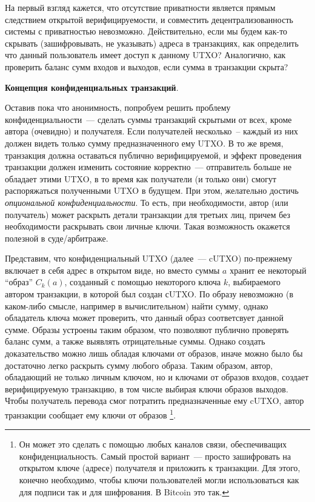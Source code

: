 \documentclass{article}
\begin{document}
 На первый взгляд кажется, что отсутствие приватности является прямым следствием
 открытой верифицируемости, и совместить децентрализованность системы с приватностью невозможно.
 Действительно, если мы будем как-то скрывать (зашифровывать, не указывать) адреса в транзакциях, как определить что
 данный пользователь имеет доступ к данному UTXO?
 Аналогично, как проверить баланс сумм входов и выходов, если сумма в транзакции скрыта?

 {\bf Концепция конфиденциальных транзакций}.

 Оставив пока что анонимность, попробуем решить проблему конфиденциальности~---
 сделать суммы транзакций скрытыми от всех, кроме автора (очевидно) и получателя.
 Если получателей несколько~-- каждый из них должен видеть только сумму предназначенного ему UTXO.
 В то же время, транзакция должна оставаться публично верифицируемой,
 и эффект проведения транзакции должен изменить состояние корректно~--- отправитель больше не обладает
 этими UTXO, в то время как получатели (и только они) смогут распоряжаться полученными UTXO в будущем.
 При этом, желательно достичь \textit{опциональной конфиденциальности}.
 То есть, при необходимости, автор (или получатель) может раскрыть детали транзакции для
 третьих лиц, причем без необходимости раскрывать свои личные ключи.
 Такая возможность окажется полезной в суде/арбитраже.

  Представим, что конфиденциальный UTXO (далее~--- cUTXO) по-прежнему включает
  в себя адрес в открытом виде,
 но вместо суммы $a$ хранит ее некоторый ``образ'' $C_k(a)$,
 созданный с помощью некоторого ключа $k$, выбираемого автором транзакции, в которой был создан сUTXO.
 По образу невозможно (в каком-либо смысле, например в вычислительном) найти сумму,
 однако обладатель ключа может проверить, что данный образ соответсвует данной сумме.
 Образы устроены таким образом, что позволяют публично проверять баланс сумм,
 а также выявлять отрицательные суммы.
 Однако создать доказательство можно лишь обладая ключами от образов,
 иначе можно было бы достаточно легко раскрыть сумму любого образа.
 Таким образом, автор, обладающий не только личным ключом, но и ключами от образов входов,
  создает верифицируемую транзакцию, в том числе выбирая ключи образов выходов.
 Чтобы получатель перевода смог потратить предназначенные ему cUTXO,
 автор транзакции сообщает ему ключи от образов
 \footnote{Он может это сделать с помощью любых каналов связи, обеспечиващих конфиденциальность.
 Самый простой вариант~--- просто зашифровать на открытом ключе (адресе) получателя и приложить к транзакции.
 Для этого, конечно необходимо, чтобы ключи пользователей могли использоваться как для подписи так и для шифрования.
 В Bitcoin это так.}.
\end{document}
